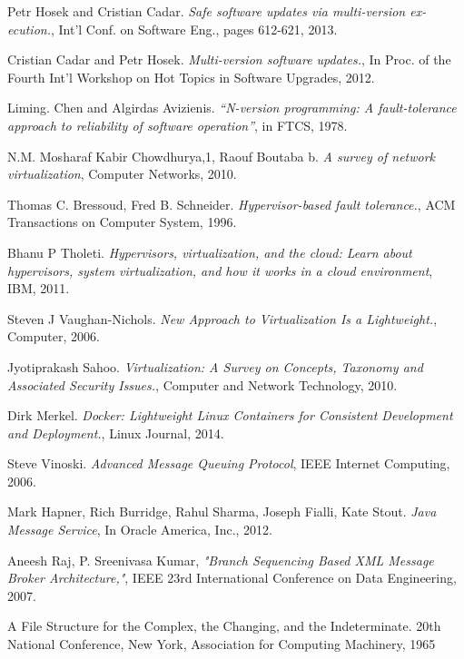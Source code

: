\documentclass[a4paper,11pt,twoside]{article}
\begin{document}
\begin{thebibliography}{1}
  Petr Hosek and Cristian Cadar. {\em Safe software updates via multi-version ex- ecution.}, Int’l Conf. on Software Eng., pages 612-621, 2013.
 
  Cristian Cadar and Petr Hosek. {\em Multi-version software updates.}, In Proc. of the Fourth Int’l Workshop on Hot Topics in Software Upgrades, 2012.

 	 Liming. Chen and Algirdas Avizienis. {\em  “N-version programming: A fault-tolerance approach to reliability of software operation”}, in FTCS, 1978. 
   
	 N.M. Mosharaf Kabir Chowdhurya,1, Raouf Boutaba b. {\em A survey of network virtualization}, Computer Networks, 2010.
   
	 Thomas C. Bressoud, Fred B. Schneider. {\em Hypervisor-based fault tolerance.}, ACM 	Transactions on Computer System, 1996.
	   
  	 Bhanu P Tholeti. {\em Hypervisors, virtualization, and the cloud: Learn about hypervisors, system virtualization, and how it works in a cloud environment}, IBM, 2011. 

	  Steven J Vaughan-Nichols. {\em New Approach to Virtualization Is a Lightweight.}, Computer, 2006.  
	 
	   Jyotiprakash Sahoo. {\em Virtualization: A Survey on Concepts, Taxonomy and Associated Security Issues.}, Computer and Network Technology, 2010.
  
    Dirk Merkel. {\em Docker: Lightweight Linux Containers for Consistent Development and Deployment.}, Linux Journal, 2014.
	
	 Steve Vinoski. {\em Advanced Message Queuing Protocol}, IEEE Internet Computing, 2006. 

     Mark Hapner, Rich Burridge, Rahul Sharma, Joseph Fialli, Kate Stout. {\em Java Message Service}, In Oracle America, Inc., 2012.

 Aneesh Raj, P. Sreenivasa Kumar, {\em "Branch Sequencing Based XML Message Broker Architecture,"}, IEEE 23rd International Conference on Data Engineering, 2007.  

 A File Structure for the Complex, the Changing, and the Indeterminate. 20th National Conference, New York, Association for Computing Machinery, 1965
  
  \end{thebibliography}
\end{document}
